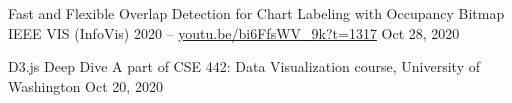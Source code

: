 \begin{cvpubs}
  \cvpub
    {Fast and Flexible Overlap Detection for Chart Labeling with Occupancy Bitmap} %
    {IEEE VIS (InfoVis) 2020  --  \href{https://youtu.be/bi6FfsWV_9k?t=1317}{youtu.be/bi6FfsWV\_9k?t=1317}} %
    {Oct 28, 2020} %
    {} %

  \cvpub
    {D3.js Deep Dive} %
    {A part of CSE 442: Data Visualization course, University of Washington} %
    {Oct 20, 2020} %
    {} %
\end{cvpubs}
